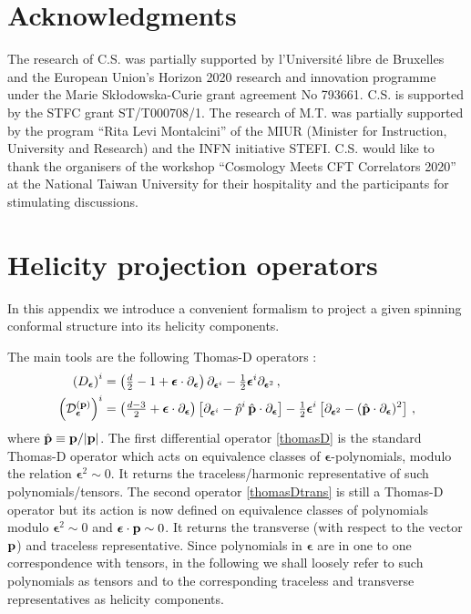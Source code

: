 \documentclass[11pt,a4paper]{article}
\newcommand{\pl}{{\partial}}
\begin{document}
\section*{Acknowledgments}

The research of C.S. was partially supported by l'Universit\'e libre de Bruxelles and the European Union's Horizon 2020 research and innovation programme under the Marie Sk\l odowska-Curie grant agreement No 793661. C.S. is supported by the STFC grant ST/T000708/1. The research of M.T. was partially supported by the program  “Rita  Levi  Montalcini”  of the MIUR (Minister for Instruction, University and Research) and the INFN initiative STEFI. C.S. would like to thank the organisers of the workshop ``Cosmology Meets CFT Correlators 2020” at the National Taiwan University for their hospitality and the participants for stimulating discussions.


\appendix




\section{Helicity projection operators}
\label{appendix::helciityproj}

In this appendix we introduce a convenient formalism to project a given spinning conformal structure into its helicity components. 

The main tools are the following Thomas-D operators \cite{Thomas352}:
\begin{subequations}\label{ThomasDs}
\begin{align}\label{thomasD}
    \left(D_{\boldsymbol{\epsilon}}\right)^i&=\left(\tfrac{d}{2}-1+ \boldsymbol{\epsilon}\cdot\pl_{\boldsymbol{\epsilon}}\right)\pl_{\boldsymbol{\epsilon}^i}-\tfrac12\boldsymbol{\epsilon}^i\pl_{\boldsymbol{\epsilon}^2}\,,\\
    \left(\mathcal{D}^{(\bold{p})}_{\boldsymbol{\epsilon}}\right)^i&=\left(\tfrac{d-3}{2}+ \boldsymbol{\epsilon}\cdot\pl_{\boldsymbol{\epsilon}}\right)\left[\pl_{\boldsymbol{\epsilon}^i}-\hat{p}^i \,\hat{{\bf p}}\cdot\pl_{\boldsymbol{\epsilon}}\right]-\tfrac12\boldsymbol{\epsilon}^i\left[\pl_{\boldsymbol{\epsilon}^2}-(\hat{{\bf p}}\cdot\pl_{\boldsymbol{\epsilon}})^2\right]\,,\label{thomasDtrans}
\end{align}
\end{subequations}
where $\hat{{\bf p}}\equiv{\bf p}/|{\bf p}|$. The first differential operator \eqref{thomasD} is the standard Thomas-D operator which acts on equivalence classes of $\boldsymbol{\epsilon}$-polynomials, modulo the relation $\boldsymbol{\epsilon}^2\sim0$. It returns the traceless/harmonic representative of such polynomials/tensors. The second operator \eqref{thomasDtrans} is still a Thomas-D operator but its action is now defined on equivalence classes of polynomials modulo $\boldsymbol{\epsilon}^2\sim0$ and $\boldsymbol{\epsilon}\cdot \bold{p}\sim0$. It returns the transverse (with respect to the vector $\bold{p}$) and traceless representative. Since polynomials in $\boldsymbol{\epsilon}$ are in one to one correspondence with tensors, in the following we shall loosely refer to such polynomials as tensors and to the corresponding traceless and transverse representatives as helicity components.
\end{document}

